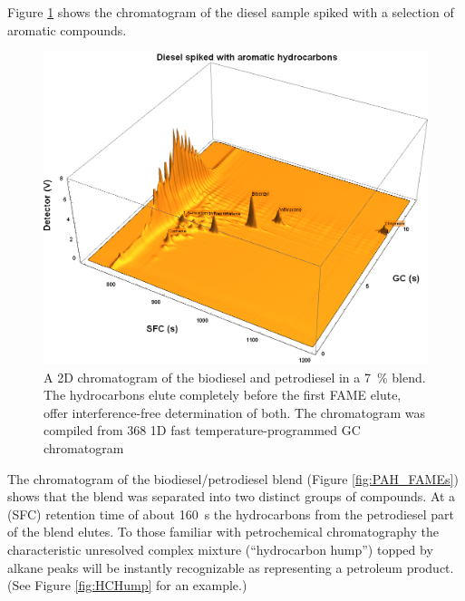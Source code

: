 Figure \ref{fig:Spiked_Diesel} shows the chromatogram of the diesel sample spiked with a selection of aromatic compounds. 


\begin{figure}
	\centering
	\includegraphics[width=\textwidth]{Figures/Spiked_Diesel.png}
	\decoRule	
	
\caption[Peak assignment in spiked ]{A 2D chromatogram of the
biodiesel and petrodiesel in a \SI{7}{\percent} blend. The hydrocarbons elute
completely before the first FAME elute, offer interference-free determination of
both. The chromatogram was compiled from \num{368} 1D fast temperature-programmed GC
chromatogram}

	\label{fig:Spiked_Diesel} 
\end{figure}



The chromatogram of the biodiesel/petrodiesel blend (Figure \ref{fig:PAH_FAMEs}) shows
that the blend was separated into two distinct groups of compounds. At a \oneD
(SFC) retention time of about \SI{160}{\second} the hydrocarbons from the
petrodiesel part of the blend elutes. To those familiar with petrochemical
chromatography the characteristic unresolved complex mixture (``hydrocarbon
hump'') topped by alkane peaks will be instantly recognizable as representing
a petroleum product. (See Figure \ref{fig:HCHump} for an example.)


